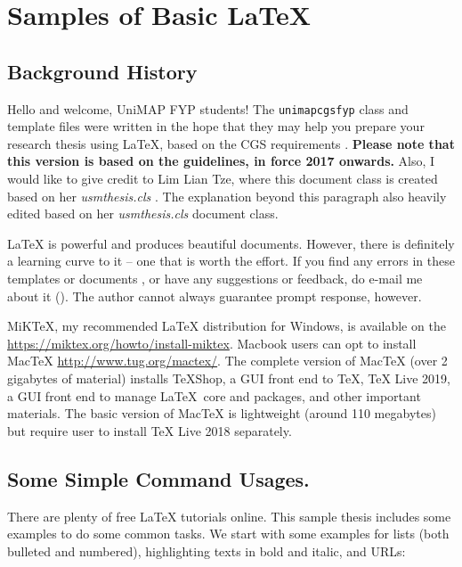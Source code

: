 \chapter{Samples of Basic \LaTeX{}}\label{chap:intro}

\section{Background History}
Hello and welcome, \ac{UniMAP} FYP students!  The \verb|unimapcgsfyp| class and template files were written in the hope that they may help you prepare your research thesis using \LaTeX, based on the \ac{CGS} requirements \citep{cgs:thesis:guideline:2017}. \textbf{Please note that this version is based on the guidelines, in force 2017 onwards.} Also, I would like to give credit to Lim Lian Tze, where this document class is created based on her \emph{usmthesis.cls} \cite{lim:2007}. The explanation beyond this paragraph also heavily edited based on her \emph{usmthesis.cls} document class. 

\LaTeX{} is powerful and produces beautiful documents.  However, there is definitely a learning curve to it -- one that is worth the effort.  %
If you find any errors in these templates or documents \citep{matsom:template}, or have any suggestions or feedback, do e-mail me about it ().  The author cannot always guarantee prompt response, however. %

MiK\TeX{}, my recommended \LaTeX{} distribution for Windows, is available on the \url{https://miktex.org/howto/install-miktex}. Macbook users can opt to install MacTeX \url{http://www.tug.org/mactex/}. The complete version of MacTeX (over 2 gigabytes of material) installs TeXShop, a GUI front end to TeX, TeX Live 2019, a GUI front end to manage \LaTeX~core and packages, and other important materials. The basic version of MacTeX is lightweight (around 110 megabytes) but require user to install TeX Live 2018 separately.

\section{Some Simple Command Usages.}

There are plenty of free \LaTeX{} tutorials online.  This sample thesis includes some examples to do some common tasks.  We start with some examples for lists (both bulleted and numbered), highlighting texts in bold and italic, and URLs:

